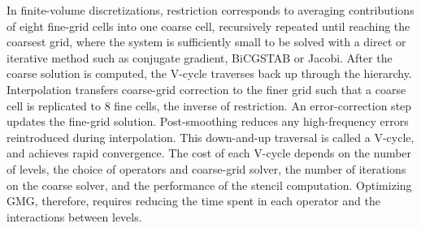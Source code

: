 \documentclass[conference]{IEEEtran}
\begin{document}
            In finite-volume discretizations, restriction corresponds to averaging contributions of eight fine-grid cells into one coarse cell, recursively repeated %
            until reaching the coarsest grid, where the system is sufficiently small to be solved with a direct or iterative method such as conjugate gradient, BiCGSTAB or Jacobi. %
            After the coarse solution is computed, the V-cycle traverses back up through the hierarchy. Interpolation transfers coarse-grid correction to the finer grid %
            such that a coarse cell is replicated to 8 fine cells, the inverse of restriction. An error-correction step updates the fine-grid solution. %
            Post-smoothing reduces any high-frequency errors reintroduced during interpolation. This down-and-up traversal is called a V-cycle, and achieves rapid convergence.
            The cost of each V-cycle depends on the number of levels, the choice of operators and coarse-grid solver, the number of iterations on the coarse solver, and the performance of the stencil computation. Optimizing GMG, therefore, requires reducing the time spent in each operator %
            and the interactions between levels. %
\end{document}
